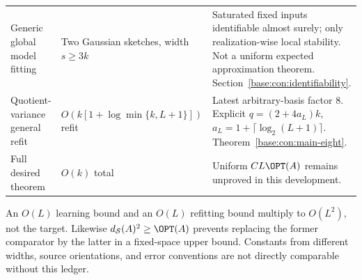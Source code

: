 \documentclass[11pt,oneside,openany,a4paper]{book}
\numberwithin{equation}{chapter}
\theoremstyle{definition}
\theoremstyle{remark}
\begin{document}
\begin{longtable}{@{}>{\RaggedRight\arraybackslash}p{.29\linewidth}>{\RaggedRight\arraybackslash}p{.18\linewidth}>{\RaggedRight\arraybackslash}p{.46\linewidth}@{}}
Generic global model fitting&Two Gaussian sketches, width $s\ge3k$&Saturated fixed inputs identifiable almost surely; only realization-wise local stability. Not a uniform expected approximation theorem. Section~\ref{base:con:identifiability}.\\
Quotient-variance general refit&$O(k[1+\log\min\{k,L+1\}])$ refit&Latest arbitrary-basis factor $8$. Explicit $q=(2+4a_L)k$, $a_L=1+\lceil\log_2(L+1)\rceil$. Theorem~\ref{base:con:main-eight}.\\
Full desired theorem&$O(k)$ total&Uniform $CL\OPT(A)$ remains unproved in this development.\\
\end{longtable}
An $O(L)$ learning bound and an $O(L)$ refitting bound multiply to $O(L^2)$, not the target. Likewise $d_{\mathcal S}(A)^2\ge\OPT(A)$ prevents replacing the former comparator by the latter in a fixed-space upper bound. Constants from different widths, source orientations, and error conventions are not directly comparable without this ledger.
\end{document}
